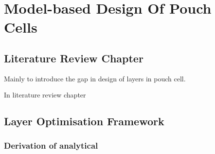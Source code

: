 
\graphicspath{{3/figures/}}

\chapter{Model-based Design Of Pouch Cells}\label{ch:modelbaseddesign}
\startcontents[chapters]

\bigskip

\section{Literature Review Chapter}
Mainly to introduce the gap in design of layers in pouch cell.


In literature review chapter


\section{Layer Optimisation Framework}
\subsection{Derivation of analytical }

